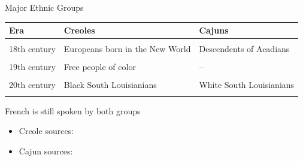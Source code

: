 \documentclass{beamer}\usepackage[]{graphicx}\usepackage[]{xcolor}
\begin{document}
    \begin{frame}{Major Ethnic Groups}
      \begin{center}
        \begin{tabular}{l | l | l}
          Era          & Creoles                                          & Cajuns \\
          \hline
                       &                                                  & \\
          18th century & \parbox[t]{3cm}{Europeans born in the New World} & \parbox[t]{3cm}{Descendents of Acadians} \\
                       &                                                  & \\
          19th century & \parbox[t]{3cm}{Free people of color}            & -- \\
                       &                                                  & \\
          20th century & \parbox[t]{3cm}{Black South Louisianians}        & \parbox[t]{3cm}{White South Louisianians} \\
                       &                                                  & \\
          \hline
        \end{tabular}
      \end{center}
      \begin{center}
        French is still spoken by both groups
      \end{center}
      {\tiny
        \begin{itemize}
          \item Creole sources: \textcite{fortier_french_1884, susberry_racial_2004, neumann_creole_1985}
          \item Cajun sources: \textcite{brown_pronominal_1988, johnson_louisiana_1976, neumann_creole_1985, smith_influence_1939, giancarlo_dont_2019}
        \end{itemize}
      }
    \end{frame}
\end{document}
